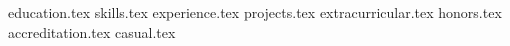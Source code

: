 \documentclass[11pt, a4paper]{awesome-cv}
\newcommand*{\sectiondir}{resume/}
\begin{document}
\makecvheader

{education.tex}
{skills.tex}
{experience.tex}
{projects.tex}
{extracurricular.tex}
{honors.tex}
{accreditation.tex}
{casual.tex}
\end{document}
